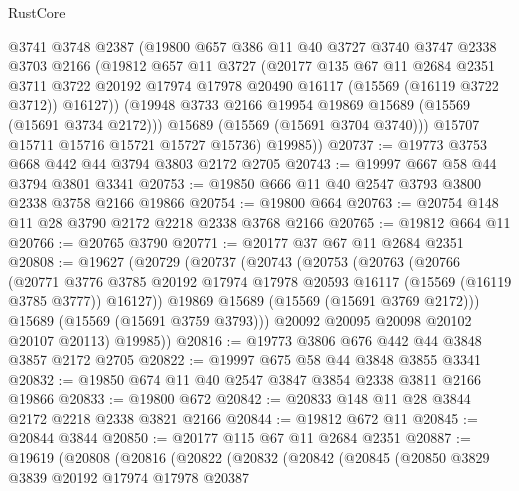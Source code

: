 \begin{lexlean}{RustCore}
\begin{coremodule}
          @3741
          @3748
          @2387
          (@19800
            @657
            @386
            @11
            @40
            @3727
            @3740
            @3747
            @2338
            @3703
            @2166
            (@19812
              @657
              @11
              @3727
              (@20177
                @135
                @67
                @11
                @2684
                @2351
                @3711
                @3722
                @20192
                @17974
                @17978
                @20490
                @16117
                (@15569 (@16119 @3722 @3712))
                @16127))
            (@19948 @3733 @2166 @19954 @19869 @15689 (@15569 (@15691 @3734 @2172)))
            @15689
            (@15569 (@15691 @3704 @3740)))
          @15707
          @15711
          @15716
          @15721
          @15727
          @15736)
        @19985))
@20737 := @19773 @3753 @668 @442 @44 @3794 @3803 @2172 @2705
@20743 := @19997 @667 @58 @44 @3794 @3801 @3341
@20753 := @19850 @666 @11 @40 @2547 @3793 @3800 @2338 @3758 @2166 @19866
@20754 := @19800 @664
@20763 := @20754 @148 @11 @28 @3790 @2172 @2218 @2338 @3768 @2166
@20765 := @19812 @664 @11
@20766 := @20765 @3790
@20771 := @20177 @37 @67 @11 @2684 @2351
@20808 := @19627
    (@20729
      (@20737
        (@20743
          (@20753
            (@20763
              (@20766
                (@20771
                  @3776
                  @3785
                  @20192
                  @17974
                  @17978
                  @20593
                  @16117
                  (@15569 (@16119 @3785 @3777))
                  @16127))
              @19869
              @15689
              (@15569 (@15691 @3769 @2172)))
            @15689
            (@15569 (@15691 @3759 @3793)))
          @20092
          @20095
          @20098
          @20102
          @20107
          @20113)
        @19985))
@20816 := @19773 @3806 @676 @442 @44 @3848 @3857 @2172 @2705
@20822 := @19997 @675 @58 @44 @3848 @3855 @3341
@20832 := @19850 @674 @11 @40 @2547 @3847 @3854 @2338 @3811 @2166 @19866
@20833 := @19800 @672
@20842 := @20833 @148 @11 @28 @3844 @2172 @2218 @2338 @3821 @2166
@20844 := @19812 @672 @11
@20845 := @20844 @3844
@20850 := @20177 @115 @67 @11 @2684 @2351
@20887 := @19619
    (@20808
      (@20816
        (@20822
          (@20832
            (@20842
              (@20845
                (@20850
                  @3829
                  @3839
                  @20192
                  @17974
                  @17978
                  @20387

\end{coremodule}
\end{lexlean}
